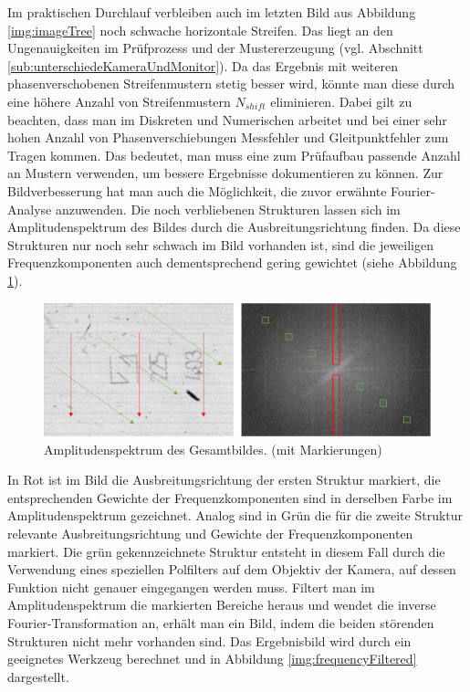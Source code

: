 Im praktischen Durchlauf verbleiben auch im letzten Bild aus Abbildung \ref{img:imageTree} noch schwache horizontale Streifen.
Das liegt an den Ungenauigkeiten im Prüfprozess und der Mustererzeugung (vgl. Abschnitt \ref{sub:unterschiedeKameraUndMonitor}).
Da das Ergebnis mit weiteren phasenverschobenen Streifenmustern stetig besser wird, könnte man diese durch eine höhere Anzahl von Streifenmustern $N_{shift}$ eliminieren.
Dabei gilt zu beachten, dass man im Diskreten und Numerischen arbeitet und bei einer sehr hohen Anzahl von Phasenverschiebungen Messfehler und Gleitpunktfehler zum Tragen kommen.
Das bedeutet, man muss eine zum Prüfaufbau passende Anzahl an Mustern verwenden, um bessere Ergebnisse dokumentieren zu können.
Zur Bildverbesserung hat man auch die Möglichkeit, die zuvor erwähnte Fourier-Analyse anzuwenden.
Die noch verbliebenen Strukturen lassen sich im Amplitudenspektrum des Bildes durch die Ausbreitungsrichtung finden.
Da diese Strukturen nur noch sehr schwach im Bild vorhanden ist, sind die jeweiligen Frequenzkomponenten auch dementsprechend gering gewichtet (siehe Abbildung \ref{img:amplitudeSpectrum}).

\begin{figure}[H]
	\centering
	\includegraphics[width=\textwidth]{03_sichtpruefungDurchLichtstreuung/optimierungen/figures/amplitudeSpectrum}
	\caption[Amplitudenspektrum des Gesamtbildes]{Amplitudenspektrum des Gesamtbildes. (mit Markierungen)}
	\label{img:amplitudeSpectrum}
\end{figure}

\noindent
In Rot ist im Bild die Ausbreitungsrichtung der ersten Struktur markiert, die entsprechenden Gewichte der Frequenzkomponenten sind in derselben Farbe im Amplitudenspektrum gezeichnet.
Analog sind in Grün die für die zweite Struktur relevante Ausbreitungsrichtung und Gewichte der Frequenzkomponenten markiert.
Die grün gekennzeichnete Struktur entsteht in diesem Fall durch die Verwendung eines speziellen Polfilters auf dem Objektiv der Kamera, auf dessen Funktion nicht genauer eingegangen werden muss.
Filtert man im Amplitudenspektrum die markierten Bereiche heraus und wendet die inverse Fourier-Transformation an, erhält man ein Bild, indem die beiden störenden Strukturen nicht mehr vorhanden sind.
Das Ergebnisbild wird durch ein geeignetes Werkzeug \cite{fourierTool} berechnet und in Abbildung \ref{img:frequencyFiltered} dargestellt.


